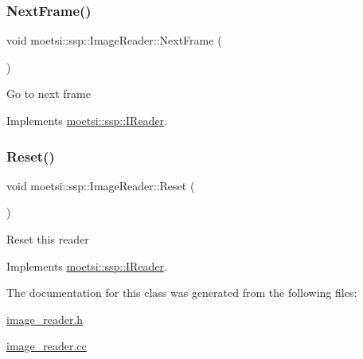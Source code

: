\subsubsection{\texorpdfstring{Next\+Frame()}{NextFrame()}}
{\footnotesize\ttfamily void moetsi\+::ssp\+::\+Image\+Reader\+::\+Next\+Frame (\begin{DoxyParamCaption}{ }\end{DoxyParamCaption})\hspace{0.3cm}{\ttfamily [virtual]}}

Go to next frame 

Implements \hyperlink{classmoetsi_1_1ssp_1_1IReader_a49e82a786cca55248e27e7fac8f97a17}{moetsi\+::ssp\+::\+I\+Reader}.

\mbox{\label{classmoetsi_1_1ssp_1_1ImageReader_ae9ffc89ceed365c96b8d50e46ee8dc20}} 
\subsubsection{\texorpdfstring{Reset()}{Reset()}}
{\footnotesize\ttfamily void moetsi\+::ssp\+::\+Image\+Reader\+::\+Reset (\begin{DoxyParamCaption}{ }\end{DoxyParamCaption})\hspace{0.3cm}{\ttfamily [virtual]}}

Reset this reader 

Implements \hyperlink{classmoetsi_1_1ssp_1_1IReader_ad6e2ef78fc2466884aa877ecef54889d}{moetsi\+::ssp\+::\+I\+Reader}.



The documentation for this class was generated from the following files\+:\begin{DoxyCompactItemize}
\item 
\hyperlink{image__reader_8h}{image\+\_\+reader.\+h}\item 
\hyperlink{image__reader_8cc}{image\+\_\+reader.\+cc}\end{DoxyCompactItemize}
